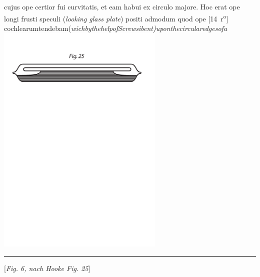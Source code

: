 cujus ope certior fui curvitatis, et eam habui ex circulo majore. Hoc erat ope longi frusti speculi (\textit{looking glass plate}) positi admodum quod ope [14~r\textsuperscript{o}] cochlearum\hfill tendebam\hfill (\textit{wich\hfill by\hfill the\hfill help\hfill of\hfill Screws\hfill i\hfill bent)\hfill upon\hfill the\hfill circular\hfill edges\hfill of\hfill a} 
\pend
\pstart
\noindent
\centering
\includegraphics[width=0.6\textwidth]{images/LH0351506_013v-d1.pdf}\\
\centering \rule[0pt]{6mm}{0pt}[\textit{Fig. 6, nach Hooke Fig. 25}]
\pend 
\newpage
\pstart